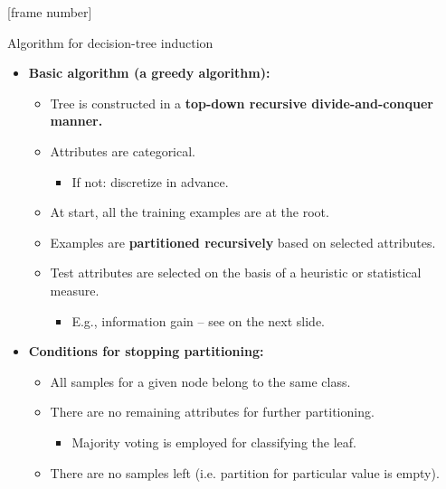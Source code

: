\documentclass[aspectratio=169,t,table]{beamer}
\begin{document}
  {
    [frame number]
    \begin{frame}{Algorithm for decision-tree induction}
        \begin{itemize}
            \item \textbf{Basic algorithm (a greedy algorithm):}
            \begin{itemize}
              \item Tree is constructed in a \textbf{\color{airforceblue}top-down recursive divide-and-conquer manner.}
              \item Attributes are categorical.
              \begin{itemize}
                \item If not: discretize in advance.
              \end{itemize}
              \item At start, all the training examples are at the root.
              \item Examples are \textbf{\color{airforceblue}partitioned recursively} based on selected attributes.
              \item Test attributes are selected on the basis of a heuristic or statistical measure.
              \begin{itemize}
                \item E.g., information gain -- see on the next slide.
              \end{itemize}
            \end{itemize}
            \item \textbf{Conditions for stopping partitioning:}
            \begin{itemize}
              \item All samples for a given node belong to the same class.
              \item There are no remaining attributes for further partitioning.
              \begin{itemize}
                \item Majority voting is employed for classifying the leaf.
              \end{itemize}
              \item There are no samples left (i.e. partition for particular value is empty).
            \end{itemize}
        \end{itemize}
    \end{frame}
  }
\end{document}
